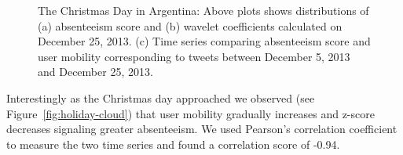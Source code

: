 \begin{figure}[t]
	\centering
	\caption{The Christmas Day in Argentina: Above plots shows distributions of (a) absenteeism score and (b) wavelet coefficients calculated on December 25, 2013. (c) Time series comparing absenteeism score and user mobility corresponding to tweets between December 5, 2013 and December 25, 2013.}
\vspace{-2mm}
\label{fig:case3_wavelet}
\end{figure}



Interestingly as the Christmas day approached we observed (see Figure~\ref{fig:holiday-cloud}) that user mobility gradually increases and z-score decreases signaling greater absenteeism. We used Pearson's correlation coefficient to measure the two time series and found a correlation score of -0.94.
